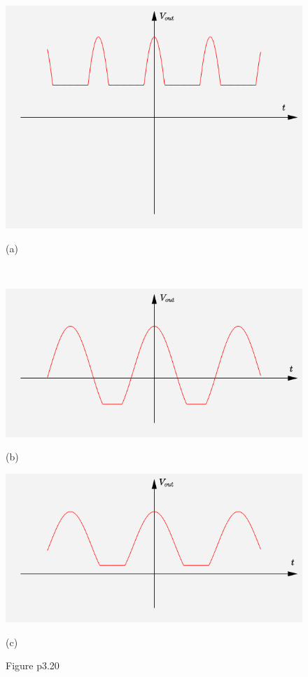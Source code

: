 \documentclass[hyperref, UTF8]{ctexart}
\begin{document}
\begin{figure}[!htb]
    \centering
    \begin{minipage}[t]{0.400\textwidth}
    \centering
    \includegraphics[width=1\textwidth]{p3-20-a.png}
    \caption*{(a)}
    \end{minipage}
    \\
    \begin{minipage}[t]{0.400\textwidth}
    \centering
    \includegraphics[width=1\textwidth]{p3-20-b.png}
    \caption*{(b)}
    \end{minipage}
    \begin{minipage}[t]{0.400\textwidth}
    \centering
    \includegraphics[width=1\textwidth]{p3-20-c.png}
    \caption*{(c)}
    \end{minipage}
    \caption*{Figure p3.20}
\end{figure}
\end{document}
